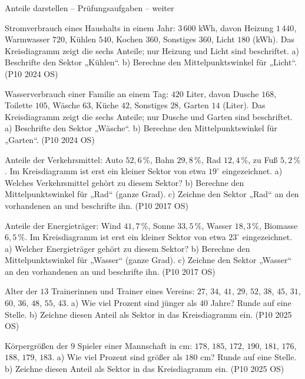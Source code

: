 \begin{aufgabe}{Anteile darstellen – Prüfungsaufgaben – weiter}
\begin{teile}
\steil Stromverbrauch eines Haushalts in einem Jahr: $3\,600$ kWh, davon Heizung $1\,440$, Warmwasser $720$, Kühlen $540$, Kochen $360$, Sonstiges $360$, Licht $180$ (kWh). Das Kreisdiagramm zeigt die sechs Anteile; nur Heizung und Licht sind beschriftet. a) Beschrifte den Sektor „Kühlen“. b) Berechne den Mittelpunktswinkel für „Licht“. \hfill (P10 2024 OS)

\steil Wasserverbrauch einer Familie an einem Tag: $420$ Liter, davon Dusche $168$, Toilette $105$, Wäsche $63$, Küche $42$, Sonstiges $28$, Garten $14$ (Liter). Das Kreisdiagramm zeigt die sechs Anteile; nur Dusche und Garten sind beschriftet. a) Beschrifte den Sektor „Wäsche“. b) Berechne den Mittelpunktswinkel für „Garten“. \hfill (P10 2024 OS)

\teil Anteile der Verkehrsmittel: Auto $52{,}6\,\%$, Bahn $29{,}8\,\%$, Rad $12{,}4\,\%$, zu Fuß $5{,}2\,\%$. Im Kreisdiagramm ist erst ein kleiner Sektor von etwa $19^\circ$ eingezeichnet. a) Welches Verkehrsmittel gehört zu diesem Sektor? b) Berechne den Mittelpunktswinkel für „Rad“ (ganze Grad). c) Zeichne den Sektor „Rad“ an den vorhandenen an und beschrifte ihn. \hfill (P10 2017 OS)

\teil Anteile der Energieträger: Wind $41{,}7\,\%$, Sonne $33{,}5\,\%$, Wasser $18{,}3\,\%$, Biomasse $6{,}5\,\%$. Im Kreisdiagramm ist erst ein kleiner Sektor von etwa $23^\circ$ eingezeichnet. a) Welcher Energieträger gehört zu diesem Sektor? b) Berechne den Mittelpunktswinkel für „Wasser“ (ganze Grad). c) Zeichne den Sektor „Wasser“ an den vorhandenen an und beschrifte ihn. \hfill (P10 2017 OS)

\teil Alter der $13$ Trainerinnen und Trainer eines Vereins: $27$, $34$, $41$, $29$, $52$, $38$, $45$, $31$, $60$, $36$, $48$, $55$, $43$. a) Wie viel Prozent sind jünger als $40$ Jahre? Runde auf eine Stelle. b) Zeichne diesen Anteil als Sektor in das Kreisdiagramm ein. \hfill (P10 2025 OS)

\kreisleer
\teil Körpergrößen der $9$ Spieler einer Mannschaft in cm: $178$, $185$, $172$, $190$, $181$, $176$, $188$, $179$, $183$. a) Wie viel Prozent sind größer als $180$ cm? Runde auf eine Stelle. b) Zeichne diesen Anteil als Sektor in das Kreisdiagramm ein. \hfill (P10 2025 OS)

\kreisleer
\end{teile}
\end{aufgabe}

